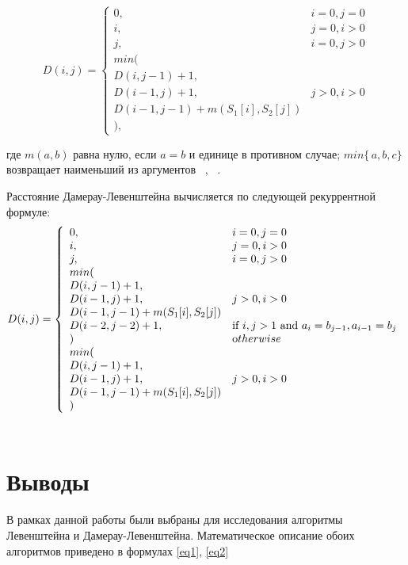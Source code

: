 \documentclass[12pt]{report}
\begin{document}
    \begin{equation} \label{eq1}
    D(i,j) = \left\{ \begin{array}{ll}
    0, & \textrm{$i = 0, j = 0$}\\
    i, & \textrm{$j = 0, i > 0$}\\
    j, & \textrm{$i = 0, j > 0$}\\
    min(\\
    D(i,j-1)+1,\\
    D(i-1, j) +1, &\textrm{$j>0, i>0$}\\
    D(i-1, j-1) + m(S_{1}[i], S_{2}[j])\\
    ),
    \end{array} \right.
    \end{equation}
    
    где $m(a,b)$ равна нулю, если $a=b$ и единице в противном случае; $min\{\,a,b,c\}$ возвращает наименьший из аргументов ~\cite{leven}, ~\cite{recurs}.
    
    Расстояние Дамерау-Левенштейна вычисляется по следующей рекуррентной формуле:
    \begin{equation} \label{eq2}
    D(i,j) = \left\{ \begin{array}{ll}
    0, & \textrm{$i = 0, j = 0$}\\
    i, & \textrm{$j = 0, i > 0$}\\
    j, & \textrm{$i = 0, j > 0$}\\
    min(\\
    D(i,j-1)+1,\\
    D(i-1, j) +1, &\textrm{$j>0, i>0$}\\
    D(i-1, j-1) + m(S_{1}[i], S_{2}[j])\\
    D(i-2, j-2) + 1, &\textrm{if $i,j>1$ and $a_{i} = b_{j-1},a_{i-1}=b_{j} $}\\
    )
    &\textrm otherwise\\
    min(\\
    D(i,j-1)+1,\\
    D(i-1, j) +1, &\textrm{$j>0, i>0$}\\
    D(i-1, j-1) + m(S_{1}[i], S_{2}[j])\\
    )
    \end{array} \right.
    \end{equation}
    ~\cite{damerau}
    \vspace{0.5cm}
    
    
    
    \section{Выводы}
		В рамках данной работы были выбраны для исследования алгоритмы Левенштейна и Дамерау-Левенштейна.
    	Математическое описание обоих алгоритмов приведено в формулах \ref{eq1}, \ref{eq2}
    
\end{document}
